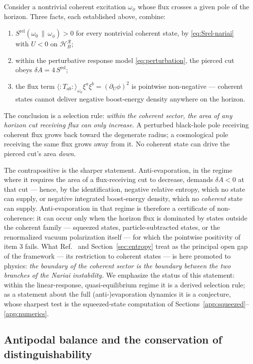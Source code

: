\documentclass[11pt]{article}
\newcommand{\Srel}{S^{\mathrm{rel}}}
\newcommand{\Nariai}{Nariai}
\begin{document}
Consider a nontrivial coherent excitation $\omega_\phi$ whose flux crosses a given pole of the horizon. Three facts, each established above, combine:
\begin{enumerate}
\item $\Srel(\omega_0\,\|\,\omega_\phi) > 0$ for every nontrivial coherent state, by \eqref{eq:Srel-nariai} with $U<0$ on $\mathcal{H}_B^{\mathcal{R}}$;
\item within the perturbative response model \eqref{eq:perturbation}, the pierced cut obeys $\delta A = 4\,\Srel$;
\item the flux term $\langle{:}T_{ab}{:}\rangle_{\omega_\phi}\xi^a\xi^b = (\partial_U\phi)^2$ is pointwise non-negative --- coherent states cannot deliver negative boost-energy density anywhere on the horizon.
\end{enumerate}
The conclusion is a selection rule: \emph{within the coherent sector, the area of any horizon cut receiving flux can only increase.} A perturbed black-hole pole receiving coherent flux grows back toward the degenerate radius; a cosmological pole receiving the same flux grows away from it. No coherent state can drive the pierced cut's area \emph{down}.

The contrapositive is the sharper statement. Anti-evaporation, in the regime where it requires the area of a flux-receiving cut to decrease, demands $\delta A < 0$ at that cut --- hence, by the identification, negative relative entropy, which no state can supply, or negative integrated boost-energy density, which no \emph{coherent} state can supply. Anti-evaporation in that regime is therefore a certificate of non-coherence: it can occur only when the horizon flux is dominated by states outside the coherent family --- squeezed states, particle-subtracted states, or the renormalized vacuum polarization itself --- for which the pointwise positivity of item 3 fails. What Ref.~\cite{DorauMuch} and Section~\ref{sec:entropy} treat as the principal open gap of the framework --- its restriction to coherent states --- is here promoted to physics: \emph{the boundary of the coherent sector is the boundary between the two branches of the \Nariai{} instability.} We emphasize the status of this statement: within the linear-response, quasi-equilibrium regime it is a derived selection rule; as a statement about the full (anti-)evaporation dynamics it is a conjecture, whose sharpest test is the squeezed-state computation of Sections~\ref{app:squeezed}--\ref{app:numerics}.

\subsection{Antipodal balance and the conservation of distinguishability}
\end{document}
